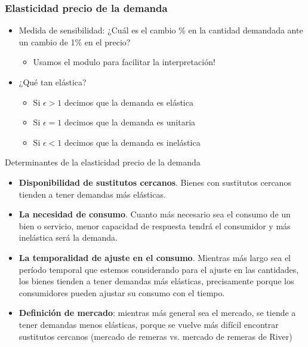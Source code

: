 \documentclass{beamer}
\begin{document}
\begin{frame}
\frametitle{Elasticidad precio de la demanda}
  \begin{itemize}
    \item Medida de sensibilidad: ¿Cuál es el cambio \% en la cantidad demandada ante un cambio de 1\% en el precio?
    \begin{itemize}
        \item Usamos el modulo para facilitar la interpretación! 
    \end{itemize}
    \item ¿Qué tan elástica?
    \begin{itemize}
      \item Si $\epsilon > 1$ decimos que la demanda es elástica
      \item Si $\epsilon = 1$ decimos que la demanda es unitaria
      \item Si $\epsilon < 1$ decimos que la demanda es inelástica
    \end{itemize}
  \end{itemize}
\end{frame}

\begin{frame}{Determinantes de la elasticidad precio de la demanda}
  \begin{itemize}
    \item \textbf{Disponibilidad de sustitutos cercanos}. Bienes con sustitutos cercanos tienden a tener demandas más elásticas.
    \item \textbf{La necesidad de consumo}. Cuanto más necesario sea el consumo de un bien o servicio, menor capacidad de
    respuesta tendrá el consumidor y más inelástica será la demanda.
    \item \textbf{La temporalidad de ajuste en el consumo}. Mientras más largo
    sea el período temporal que estemos considerando para el ajuste en las cantidades,
    los bienes tienden a tener demandas más elásticas, precisamente
    porque los consumidores pueden ajustar su consumo con el tiempo.
    \item \textbf{Definición de mercado}: mientras más general sea el mercado, se tiende a tener demandas menos elásticas, porque se vuelve más difícil encontrar sustitutos cercanos (mercado de remeras vs. mercado de remeras de River)
  \end{itemize}
\end{frame}
\end{document}
